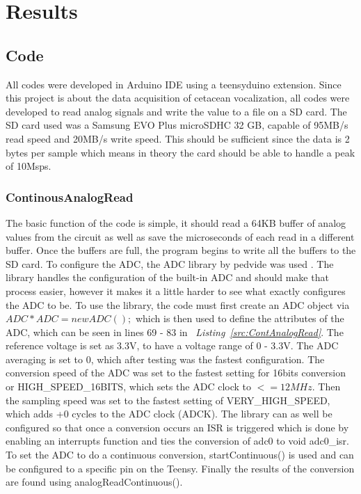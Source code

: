 \chapter{Results}



\section{Code}


All codes were developed in Arduino IDE using a teensyduino extension.
Since this project is about the data acquisition of cetacean vocalization, all codes were developed to read analog signals and write the value to a file on a SD card.
The SD card used was a Samsung EVO Plus microSDHC 32 GB, capable of 95MB/s read speed and 20MB/s write speed.
This should be sufficient since the data is 2 bytes per sample which means in theory the card should be able to handle a peak of 10Msps.




\subsection{ContinousAnalogRead}

The basic function of the code is simple, it should read a 64KB buffer of analog values from the circuit as well as save the microseconds of each read in a different buffer.
Once the buffers are full, the program begins to write all the buffers to the SD card.
To configure the ADC, the ADC library by pedvide was used \cite{villanueva_pedvideadc_2021}.
The library handles the configuration of the built-in ADC and should make that process easier, however it makes it a little harder to see what exactly configures the ADC to be.
To use the library, the code must first create an ADC object via 
$ADC *ADC = new ADC();$
which is then used to define the attributes of the ADC, which can be seen in lines 69 - 83 in~ \textit{Listing~\ref{src:ContAnalogRead}}. 
The reference voltage is set as 3.3V, to have a voltage range of 0 - 3.3V.
The ADC averaging is set to 0, which after testing was the fastest configuration.
The conversion speed of the ADC was set to the fastest setting for 16bits conversion or HIGH\_SPEED\_16BITS, which sets the ADC clock to $<= 12 MHz$.
Then the sampling speed was set to the fastest setting of VERY\_HIGH\_SPEED, which adds +0 cycles to the ADC clock (ADCK).
The library can as well be configured so that once a conversion occurs an ISR is triggered which is done by enabling an interrupts function and ties the conversion of adc0 to void adc0\_isr.
To set the ADC to do a continuous conversion, startContinuous() is used and can be configured to a specific pin on the Teensy.
Finally the results of the conversion are found using analogReadContinuous().

